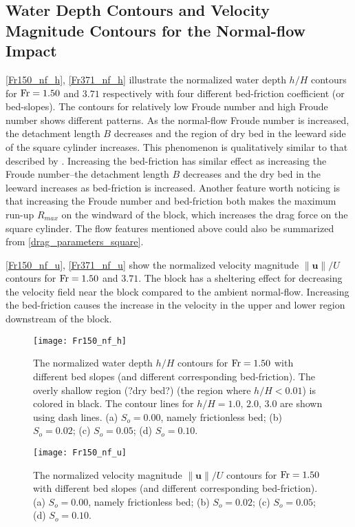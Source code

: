 \documentclass{jfm}
\newcommand{\fr}{{\rm{Fr}}}
\begin{document}
\subsection{Water Depth Contours and Velocity Magnitude Contours for the Normal-flow Impact}
\autoref{Fr150_nf_h}, \autoref{Fr371_nf_h} illustrate the normalized water depth $h/H$ contours for $\fr=1.50$ and $3.71$ respectively with four different bed-friction coefficient (or bed-slopes). The contours for relatively low Froude number and high Froude number shows different patterns. As the normal-flow Froude number is increased, the detachment length $B$ decreases and the region of  dry bed in the leeward side of the square cylinder increases. This phenomenon is qualitatively similar to that described by \cite{Causon2001}. Increasing the bed-friction has similar effect as increasing the Froude number--the detachment length $B$ decreases and the dry bed in the leeward  increases as bed-friction is increased. Another feature worth noticing is that increasing the Froude number and bed-friction both makes the maximum run-up $R_{max}$ on the windward of the block, which increases the drag force on the square cylinder. The flow features mentioned above could also be summarized from \autoref{drag_parameters_square}.

\autoref{Fr150_nf_u}, \autoref{Fr371_nf_u} show the normalized velocity magnitude $\left\|{\pmb{u}}\right\|/U$ contours for $\fr=1.50$ and $3.71$. The block has a sheltering effect for decreasing the velocity field near the block compared to the ambient normal-flow. Increasing the bed-friction causes the increase in the velocity in the upper and lower region downstream of the block.



\begin{figure}
	\centerline{\texttt{[image: Fr150\_nf\_h]}}
	\caption{The normalized water depth $h/H$ contours for $\fr=1.50$ with different bed slopes (and different corresponding bed-friction). The overly shallow region (?dry bed?) (the region where $h/H<0.01$) is colored in black.  The contour lines for $h/H=1.0,\, 2.0,\, 3.0$ are shown using dash lines. (a) $S_o=0.00$, namely frictionless bed; (b) $S_o=0.02$; (c) $S_o=0.05$; (d) $S_o=0.10$.} 
	\label{Fr150_nf_h}
\end{figure}

\begin{figure}
	\centerline{\texttt{[image: Fr150\_nf\_u]}}
	\caption{The normalized velocity magnitude  $\left\|{\pmb{u}}\right\|/U$ contours for $\fr=1.50$ with different bed slopes (and different corresponding bed-friction).  (a) $S_o=0.00$, namely frictionless bed; (b) $S_o=0.02$; (c) $S_o=0.05$; (d) $S_o=0.10$.} 
	\label{Fr150_nf_u}
\end{figure}
\end{document}

